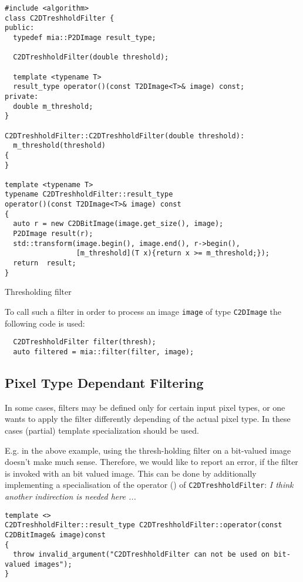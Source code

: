 \documentclass[english, 10pt, a4paper,headsepline,openany]{scrbook}
\begin{document}
\begin{listing}
\begin{lstlisting}
#include <algorithm>
class C2DTreshholdFilter {
public: 
  typedef mia::P2DImage result_type; 
  
  C2DTreshholdFilter(double threshold); 

  template <typename T> 
  result_type operator()(const T2DImage<T>& image) const; 
private:
  double m_threshold; 
}

C2DTreshholdFilter::C2DTreshholdFilter(double threshold):
  m_threshold(threshold)
{
}

template <typename T> 
typename C2DTreshholdFilter::result_type 
operator()(const T2DImage<T>& image) const
{
  auto r = new C2DBitImage(image.get_size(), image); 
  P2DImage result(r); 
  std::transform(image.begin(), image.end(), r->begin(), 
                 [m_threshold](T x){return x >= m_threshold;});
  return  result; 
}
\end{lstlisting}
\caption{\label{list:filterthreshold}Thresholding filter}
\end{listing}


To call such a filter in order to process an image \texttt{image} of type \texttt{C2DImage} 
   the following code is used: 
\begin{lstlisting}
  C2DTreshholdFilter filter(thresh); 
  auto filtered = mia::filter(filter, image); 
\end{lstlisting}


  
\subsection{Pixel Type Dependant Filtering}
\label{sec:ptdf}

In some cases, filters may be defined only for certain input pixel types, or one wants to apply 
   the filter differently depending of the actual pixel type. 
In these cases (partial) template specialization should be used. 

E.g. in the above example, using the thresh-holding filter on a bit-valued image doesn't make much sense. 
Therefore, we would like to report an error, if the filter is invoked with an bit valued image. 
This can be done  by additionally implementing a specialisation of the 
  operator () of \texttt{C2DTreshholdFilter}: 
\emph{I think another indirection is needed here ...}
\begin{lstlisting}
template <>
C2DTreshholdFilter::result_type C2DTreshholdFilter::operator(const C2DBitImage& image)const 
{
  throw invalid_argument("C2DTreshholdFilter can not be used on bit-valued images"); 
}
\end{lstlisting}
 
\end{document}
